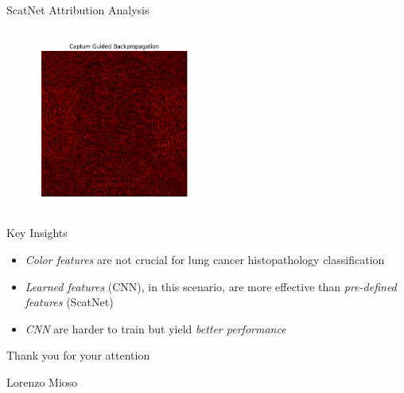 \documentclass[aspectratio=169,8pt]{beamer}  %
\begin{document}
\begin{frame}{ScatNet Attribution Analysis}
\begin{columns}[T]
\begin{column}{0.5\textwidth}
\begin{figure}
\vspace{0.2cm}
\includegraphics[width=0.45\textwidth]{imgs/scatnet_gbp_captum.png}
\end{figure}
\end{column}
\end{columns}
\end{frame}


\begin{frame}{Key Insights}
\begin{itemize}
\item \emph{Color features} are not crucial for lung cancer histopathology classification
\item \emph{Learned features} (CNN), in this scenario, are more effective than \emph{pre-defined features} (ScatNet)
\item \emph{CNN} are harder to train but yield \emph{better performance}
\end{itemize}
\end{frame}

\begin{frame}[plain]
\centering
\vspace{2cm}
{\Large Thank you for your attention}

\vspace{1cm}
{\large Lorenzo Mioso}
\end{frame}
\end{document}
